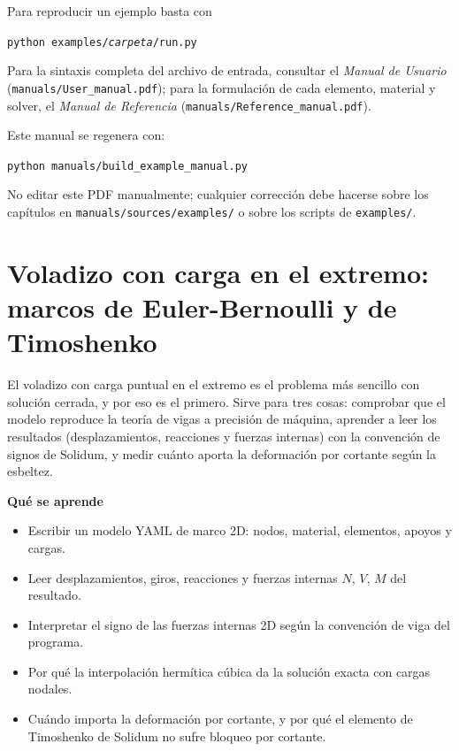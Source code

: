 \documentclass[11pt,oneside]{report}
\renewcommand{\chaptermark}[1]{\markboth{Cap.\ \thechapter\ ---\ #1}{}}
\begin{document}
Para reproducir un ejemplo basta con
\begin{center}\texttt{python examples/\textit{carpeta}/run.py}\end{center}

Para la sintaxis completa del archivo de entrada, consultar el \emph{Manual de Usuario} (\texttt{manuals/User\_manual.pdf}); para la formulación de cada elemento, material y solver, el \emph{Manual de Referencia} (\texttt{manuals/Reference\_manual.pdf}).

Este manual se regenera con:
\begin{center}\texttt{python manuals/build\_example\_manual.py}\end{center}

\noindent No editar este PDF manualmente; cualquier corrección debe hacerse sobre los capítulos en \texttt{manuals/sources/examples/} o sobre los scripts de \texttt{examples/}.

\newpage
{}
\setcounter{page}{1}


\chapter{Voladizo con carga en el extremo: marcos de Euler-Bernoulli y de Timoshenko}
\chaptermark{Voladizo con carga en el extremo}
\label{cap:voladizo_marco}





El voladizo con carga puntual en el extremo es el problema más sencillo con solución cerrada, y por eso es el primero. Sirve para tres cosas: comprobar que el modelo reproduce la teoría de vigas a precisión de máquina, aprender a leer los resultados (desplazamientos, reacciones y fuerzas internas) con la convención de signos de Solidum, y medir cuánto aporta la deformación por cortante según la esbeltez.

\textbf{Qué se aprende}

\begin{itemize}
  \item Escribir un modelo YAML de marco 2D: nodos, material, elementos, apoyos y cargas.
  \item Leer desplazamientos, giros, reacciones y fuerzas internas $N$, $V$, $M$ del resultado.
  \item Interpretar el signo de las fuerzas internas 2D según la convención de viga del programa.
  \item Por qué la interpolación hermítica cúbica da la solución exacta con cargas nodales.
  \item Cuándo importa la deformación por cortante, y por qué el elemento de Timoshenko de Solidum no sufre bloqueo por cortante.
\end{itemize}
\end{document}
